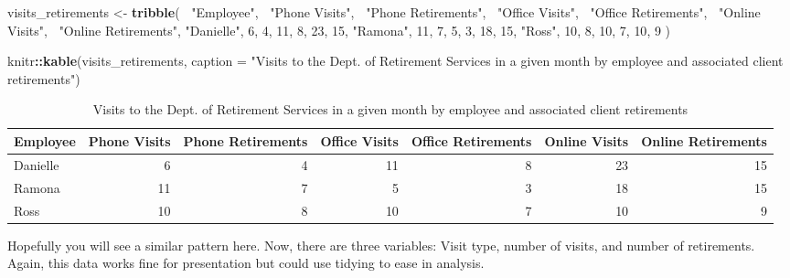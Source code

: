 \documentclass[]{book}
\newenvironment{Shaded}{\begin{snugshade}}{\end{snugshade}}
\newcommand{\DataTypeTok}[1]{\textcolor[rgb]{0.13,0.29,0.53}{#1}}
\newcommand{\DecValTok}[1]{\textcolor[rgb]{0.00,0.00,0.81}{#1}}
\newcommand{\KeywordTok}[1]{\textcolor[rgb]{0.13,0.29,0.53}{\textbf{#1}}}
\newcommand{\NormalTok}[1]{#1}
\newcommand{\OperatorTok}[1]{\textcolor[rgb]{0.81,0.36,0.00}{\textbf{#1}}}
\newcommand{\StringTok}[1]{\textcolor[rgb]{0.31,0.60,0.02}{#1}}
\begin{document}
\begin{Shaded}
\begin{Highlighting}[]
\NormalTok{visits_retirements <-}\StringTok{ }\KeywordTok{tribble}\NormalTok{(}
  \OperatorTok{~}\StringTok{"Employee"}\NormalTok{, }\OperatorTok{~}\StringTok{"Phone Visits"}\NormalTok{, }\OperatorTok{~}\StringTok{"Phone Retirements"}\NormalTok{, }\OperatorTok{~}\StringTok{"Office Visits"}\NormalTok{, }\OperatorTok{~}\StringTok{"Office Retirements"}\NormalTok{, }\OperatorTok{~}\StringTok{"Online Visits"}\NormalTok{, }\OperatorTok{~}\StringTok{"Online Retirements"}\NormalTok{,}
  \StringTok{"Danielle"}\NormalTok{, }\DecValTok{6}\NormalTok{, }\DecValTok{4}\NormalTok{, }\DecValTok{11}\NormalTok{, }\DecValTok{8}\NormalTok{, }\DecValTok{23}\NormalTok{, }\DecValTok{15}\NormalTok{,}
  \StringTok{"Ramona"}\NormalTok{, }\DecValTok{11}\NormalTok{, }\DecValTok{7}\NormalTok{, }\DecValTok{5}\NormalTok{, }\DecValTok{3}\NormalTok{, }\DecValTok{18}\NormalTok{, }\DecValTok{15}\NormalTok{,}
  \StringTok{"Ross"}\NormalTok{, }\DecValTok{10}\NormalTok{, }\DecValTok{8}\NormalTok{, }\DecValTok{10}\NormalTok{, }\DecValTok{7}\NormalTok{, }\DecValTok{10}\NormalTok{, }\DecValTok{9} 
\NormalTok{)}

\NormalTok{knitr}\OperatorTok{::}\KeywordTok{kable}\NormalTok{(visits_retirements, }\DataTypeTok{caption =} \StringTok{"Visits to the Dept. of Retirement Services in a given month by employee and associated client retirements"}\NormalTok{)}
\end{Highlighting}
\end{Shaded}

\begin{table}

\caption{\label{tab:unnamed-chunk-4}Visits to the Dept. of Retirement Services in a given month by employee and associated client retirements}
\centering
\begin{tabular}[t]{l|r|r|r|r|r|r}
\hline
Employee & Phone Visits & Phone Retirements & Office Visits & Office Retirements & Online Visits & Online Retirements\\
\hline
Danielle & 6 & 4 & 11 & 8 & 23 & 15\\
\hline
Ramona & 11 & 7 & 5 & 3 & 18 & 15\\
\hline
Ross & 10 & 8 & 10 & 7 & 10 & 9\\
\hline
\end{tabular}
\end{table}

Hopefully you will see a similar pattern here. Now, there are three variables: Visit type, number of visits, and number of retirements. Again, this data works fine for presentation but could use tidying to ease in analysis.
\end{document}
